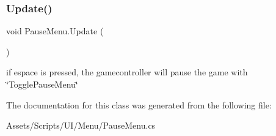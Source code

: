 \subsubsection{\texorpdfstring{Update()}{Update()}}
{\footnotesize\ttfamily void Pause\+Menu.\+Update (\begin{DoxyParamCaption}{ }\end{DoxyParamCaption})\hspace{0.3cm}{\ttfamily [private]}}

if espace is pressed, the gamecontroller will pause the game with \char`\"{}\+Toggle\+Pause\+Menu\char`\"{} 

The documentation for this class was generated from the following file\+:\begin{DoxyCompactItemize}
\item 
Assets/\+Scripts/\+U\+I/\+Menu/Pause\+Menu.\+cs\end{DoxyCompactItemize}
